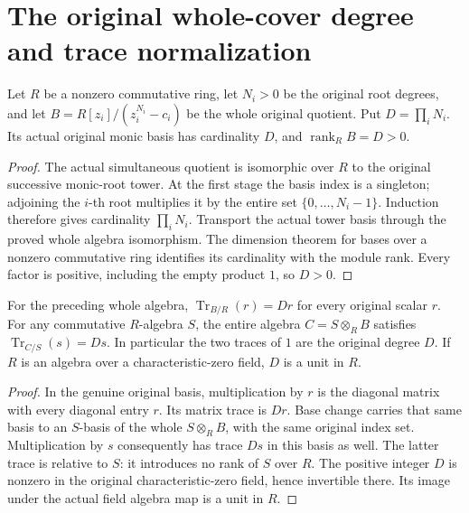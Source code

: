 \section{The original whole-cover degree and trace normalization}
\label{sec:kn-nadel-whole-cover-degree}

\begin{lemma}
\label{lem:kn-nadel-whole-cover-degree}
\leanok
Let $R$ be a nonzero commutative ring, let $N_i>0$ be the original
root degrees, and let $B=R[z_i]/(z_i^{N_i}-c_i)$ be the whole original
quotient. Put $D=\prod_iN_i$. Its actual original monic basis has
cardinality $D$, and $\operatorname{rank}_R B=D>0$.
\end{lemma}
\begin{proof}
The actual simultaneous quotient is isomorphic over $R$ to the original
successive monic-root tower. At the first stage the basis index is a
singleton; adjoining the $i$-th root multiplies it by the entire set
$\{0,\ldots,N_i-1\}$. Induction therefore gives cardinality
$\prod_iN_i$. Transport the actual tower basis through the proved whole
algebra isomorphism. The dimension theorem for bases over a nonzero
commutative ring identifies its cardinality with the module rank.
Every factor is positive, including the empty product $1$, so $D>0$.
\end{proof}

\begin{lemma}
\label{lem:kn-nadel-whole-cover-trace-degree}
\leanok
For the preceding whole algebra,
$\operatorname{Tr}_{B/R}(r)=Dr$ for every original scalar $r$.
For any commutative $R$-algebra $S$, the entire algebra
$C=S\otimes_RB$ satisfies
$\operatorname{Tr}_{C/S}(s)=Ds$. In particular the two traces of $1$
are the original degree $D$. If $R$ is an algebra over a
characteristic-zero field, $D$ is a unit in $R$.
\end{lemma}
\begin{proof}
In the genuine original basis, multiplication by $r$ is the diagonal
matrix with every diagonal entry $r$. Its matrix trace is $Dr$.
Base change carries that same basis to an $S$-basis of the whole
$S\otimes_RB$, with the same original index set. Multiplication by
$s$ consequently has trace $Ds$ in this basis as well. The latter
trace is relative to $S$: it introduces no rank of $S$ over $R$.
The positive integer $D$ is nonzero in the original characteristic-zero
field, hence invertible there. Its image under the actual field algebra
map is a unit in $R$.
\end{proof}
